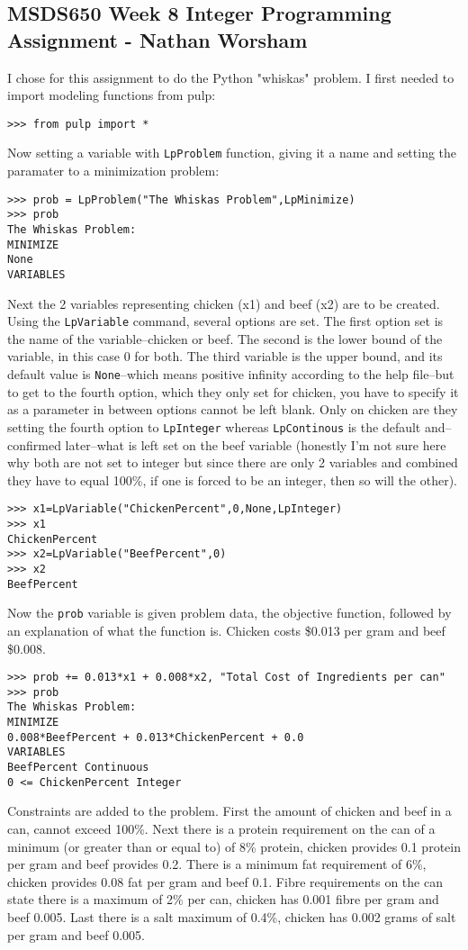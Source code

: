 \documentclass[10pt]{article}
\begin{document}
\subsection*{MSDS650 Week 8 Integer Programming Assignment - Nathan Worsham}
I chose for this assignment to do the Python "whiskas" problem.
I first needed to import modeling functions from pulp:
\begin{verbatim}
>>> from pulp import *
\end{verbatim}
Now setting a variable with \verb|LpProblem| function, giving it a name and setting the paramater to a minimization problem:
\begin{verbatim}
>>> prob = LpProblem("The Whiskas Problem",LpMinimize)
>>> prob
The Whiskas Problem:
MINIMIZE
None
VARIABLES
\end{verbatim}
Next the 2 variables representing chicken (x1) and beef (x2) are to be created. Using the \verb|LpVariable| command, several options are set. The first option set is the name of the variable--chicken or beef. The second is the lower bound of the variable, in this case 0 for both. The third variable is the upper bound, and its default value is \verb|None|--which means positive infinity according to the help file--but to get to the fourth option, which they only set for chicken, you have to specify it as a parameter in between options cannot be left blank. Only on chicken are they setting the fourth option to \verb|LpInteger| whereas \verb|LpContinous| is the default and--confirmed later--what is left set on the beef variable (honestly I'm not sure here why both are not set to integer but since there are only 2 variables and combined they have to equal 100\%, if one is forced to be an integer, then so will the other).
\begin{verbatim}
>>> x1=LpVariable("ChickenPercent",0,None,LpInteger)
>>> x1
ChickenPercent
>>> x2=LpVariable("BeefPercent",0)
>>> x2
BeefPercent
\end{verbatim}
Now the \verb|prob| variable is given problem data, the objective function, followed by an explanation of what the function is. Chicken costs \$0.013 per gram and beef \$0.008.
\begin{verbatim}
>>> prob += 0.013*x1 + 0.008*x2, "Total Cost of Ingredients per can"
>>> prob
The Whiskas Problem:
MINIMIZE
0.008*BeefPercent + 0.013*ChickenPercent + 0.0
VARIABLES
BeefPercent Continuous
0 <= ChickenPercent Integer
\end{verbatim}
Constraints are added to the problem. First the amount of chicken and beef in a can, cannot exceed 100\%. Next there is a protein requirement on the can of a minimum (or greater than or equal to) of 8\% protein, chicken provides 0.1 protein per gram and beef provides 0.2. There is a minimum fat requirement of 6\%, chicken provides 0.08 fat per gram and beef 0.1. Fibre requirements on the can state there is a maximum of 2\% per can, chicken has 0.001 fibre per gram and beef 0.005. Last there is a salt maximum of 0.4\%, chicken has 0.002 grams of salt per gram and beef 0.005. 
\end{document}
